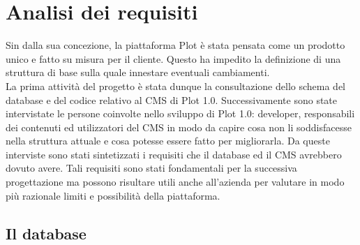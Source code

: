 
\chapter{Analisi dei requisiti}
\label{cap:analisi-requisiti}

Sin dalla sua concezione, la piattaforma Plot è stata pensata come un prodotto unico e fatto su misura per il cliente. Questo ha impedito la definizione di una struttura di base sulla quale innestare eventuali cambiamenti. \\
La prima attività del progetto è stata dunque la consultazione dello schema del database e del codice relativo al CMS di Plot 1.0. Successivamente sono state intervistate le persone coinvolte nello sviluppo di Plot 1.0: developer, responsabili dei contenuti ed utilizzatori del CMS in modo da capire cosa non li soddisfacesse nella struttura attuale e cosa potesse essere fatto per migliorarla.
Da queste interviste sono stati sintetizzati i requisiti che il database ed il CMS avrebbero dovuto avere. Tali requisiti sono stati fondamentali per la successiva progettazione ma possono risultare utili anche all'azienda per valutare in modo più razionale limiti e possibilità della piattaforma.

\section{Il database}
